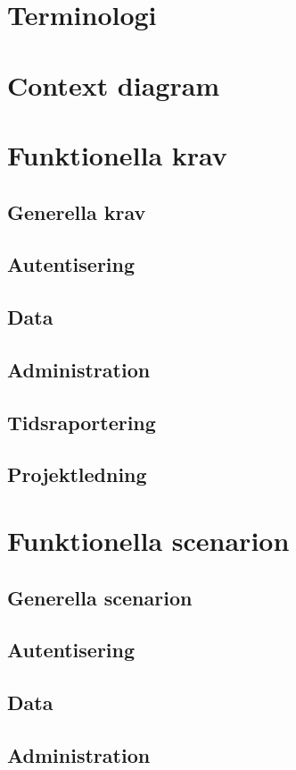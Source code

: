 \documentclass[a4paper]{article}
\begin{document}
\section{Terminologi}
\section{Context diagram}
\section{Funktionella krav}
\subsection{Generella krav}
\subsection{Autentisering}
\subsection{Data}
\subsection{Administration}
\subsection{Tidsraportering}
\subsection{Projektledning}
\section{Funktionella scenarion}
\subsection{Generella scenarion}
\subsection{Autentisering}
\subsection{Data}
\subsection{Administration}
\end{document}
